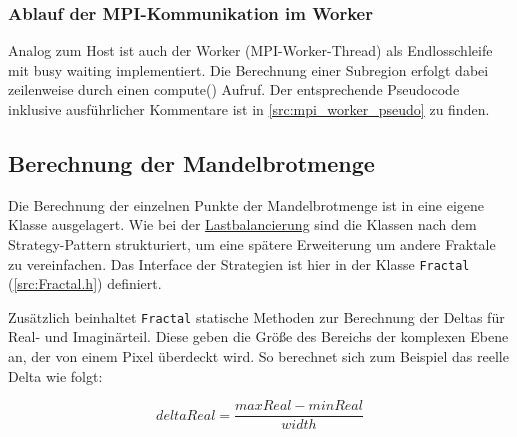 \begin{figure}[!h]
	
\end{figure}

\subsubsection{Ablauf der MPI-Kommunikation im Worker}\label{para:impl_mpi_worker}

Analog zum Host ist auch der Worker (MPI-Worker-Thread) als Endlosschleife mit busy waiting implementiert. Die Berechnung einer Subregion erfolgt dabei zeilenweise durch einen compute() Aufruf. Der entsprechende Pseudocode inklusive ausführlicher Kommentare ist in \autoref{src:mpi_worker_pseudo} zu finden.

\begin{figure}[!h]
	
\end{figure}


\subsection{Berechnung der Mandelbrotmenge}\label{sec:mandelbrot_calculation}

Die Berechnung der einzelnen Punkte der Mandelbrotmenge ist in eine eigene Klasse ausgelagert.
Wie bei der \hyperref[sec:load_balancing]{Lastbalancierung} sind die Klassen nach dem Strategy-Pattern strukturiert, um eine spätere Erweiterung um andere Fraktale zu vereinfachen.
Das Interface der Strategien ist hier in der Klasse \verb|Fractal| (\autoref{src:Fractal.h}) definiert.

\begin{figure}
	
\end{figure}

Zusätzlich beinhaltet \verb|Fractal| statische Methoden zur Berechnung der Deltas für Real- und Imaginärteil.
Diese geben die Größe des Bereichs der komplexen Ebene an, der von einem Pixel überdeckt wird.
So berechnet sich zum Beispiel das reelle Delta wie folgt:

\begin{equation*}
	deltaReal = \frac{maxReal - minReal}{width}
\end{equation*}

